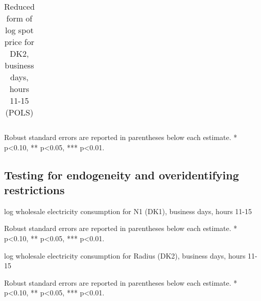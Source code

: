 \begin{table}[H]
\begin{threeparttable}
  \centering
  \caption{Reduced form of log spot price for DK2, business days, hours 11-15 (POLS)}
  \label{tab:reduced_form_price_dk2}
  \footnotesize
  \begin{tabular}{lcccc}
         
  \end{tabular}
    \begin{tablenotes}
        \item Robust standard errors are reported in parentheses below each estimate. * p<0.10, ** p<0.05, *** p<0.01.
    \end{tablenotes}
\end{threeparttable}
\end{table}

\clearpage

\subsection{Testing for endogeneity and overidentifying restrictions}
\label{app:endog_overid}
\begin{table}[H]
\centering
\begin{threeparttable}
  \caption{log wholesale electricity consumption for N1 (DK1), business days, hours 11-15}
  \label{tab:ws_endog_overid_131}
  \footnotesize
    
    \begin{tablenotes}
    \item Robust standard errors are reported in parentheses below each estimate. * p<0.10, ** p<0.05, *** p<0.01.
  \end{tablenotes}
\end{threeparttable}
\end{table}
\begin{table}[H]
\centering
\begin{threeparttable}
  \caption{log wholesale electricity consumption for Radius (DK2), business days, hours 11-15}
  \label{tab:ws_endog_overid_791}
  \footnotesize
    
    \begin{tablenotes}
    \item Robust standard errors are reported in parentheses below each estimate. * p<0.10, ** p<0.05, *** p<0.01.
  \end{tablenotes}
\end{threeparttable}
\end{table}
